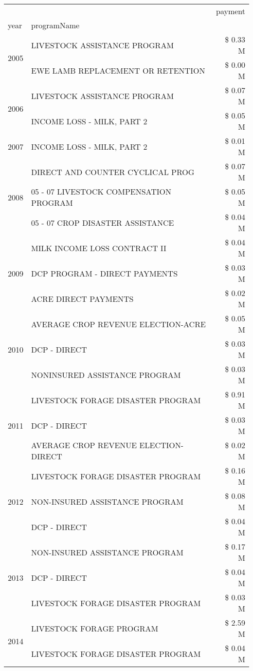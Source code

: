 \begin{tabular}{llr}
\toprule
 &  & payment \\
year & programName &  \\
\midrule
\multirow[t]{2}{*}{2005} & LIVESTOCK ASSISTANCE PROGRAM & \$ 0.33 M \\
 & EWE LAMB REPLACEMENT OR RETENTION & \$ 0.00 M \\
\cline{1-3}
\multirow[t]{2}{*}{2006} & LIVESTOCK ASSISTANCE PROGRAM & \$ 0.07 M \\
 & INCOME LOSS - MILK, PART 2 & \$ 0.05 M \\
\cline{1-3}
2007 & INCOME LOSS - MILK, PART 2 & \$ 0.01 M \\
\cline{1-3}
\multirow[t]{3}{*}{2008} & DIRECT AND COUNTER CYCLICAL PROG & \$ 0.07 M \\
 & 05 - 07 LIVESTOCK COMPENSATION PROGRAM & \$ 0.05 M \\
 & 05 - 07 CROP DISASTER ASSISTANCE & \$ 0.04 M \\
\cline{1-3}
\multirow[t]{3}{*}{2009} & MILK INCOME LOSS CONTRACT II & \$ 0.04 M \\
 & DCP PROGRAM - DIRECT PAYMENTS & \$ 0.03 M \\
 & ACRE DIRECT PAYMENTS & \$ 0.02 M \\
\cline{1-3}
\multirow[t]{3}{*}{2010} & AVERAGE CROP REVENUE ELECTION-ACRE & \$ 0.05 M \\
 & DCP - DIRECT & \$ 0.03 M \\
 & NONINSURED ASSISTANCE PROGRAM & \$ 0.03 M \\
\cline{1-3}
\multirow[t]{3}{*}{2011} & LIVESTOCK FORAGE DISASTER PROGRAM & \$ 0.91 M \\
 & DCP - DIRECT & \$ 0.03 M \\
 & AVERAGE CROP REVENUE ELECTION-DIRECT & \$ 0.02 M \\
\cline{1-3}
\multirow[t]{3}{*}{2012} & LIVESTOCK FORAGE DISASTER PROGRAM & \$ 0.16 M \\
 & NON-INSURED ASSISTANCE PROGRAM & \$ 0.08 M \\
 & DCP - DIRECT & \$ 0.04 M \\
\cline{1-3}
\multirow[t]{3}{*}{2013} & NON-INSURED ASSISTANCE PROGRAM & \$ 0.17 M \\
 & DCP - DIRECT & \$ 0.04 M \\
 & LIVESTOCK FORAGE DISASTER PROGRAM & \$ 0.03 M \\
\cline{1-3}
\multirow[t]{3}{*}{2014} & LIVESTOCK FORAGE PROGRAM & \$ 2.59 M \\
 & LIVESTOCK FORAGE DISASTER PROGRAM & \$ 0.04 M \\

\end{tabular}
